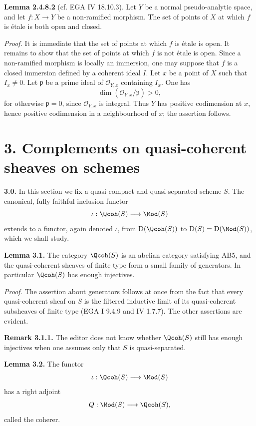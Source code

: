 \documentclass[11pt]{article}
\begin{document}
\textbf{Lemma 2.4.8.2} (cf. EGA IV 18.10.3). Let $Y$ be a normal pseudo-analytic space, and let $f:X\to Y$ be a non-ramified morphism. The set of points of $X$ at which $f$ is étale is both open and closed.

\emph{Proof.} It is immediate that the set of points at which $f$ is étale is open. It remains to show that the set of points at which $f$ is not étale is open. Since a non-ramified morphism is locally an immersion, one may suppose that $f$ is a closed immersion defined by a coherent ideal $I$. Let $x$ be a point of $X$ such that $I_x\ne0$. Let $\mathfrak p$ be a prime ideal of $\mathcal O_{Y,x}$ containing $I_x$. One has
\[
 \dim(\mathcal O_{Y,x}/\mathfrak p)>0,
\]
for otherwise $\mathfrak p=0$, since $\mathcal O_{Y,x}$ is integral. Thus $Y$ has positive codimension at $x$, hence positive codimension in a neighbourhood of $x$; the assertion follows.

\section*{3. Complements on quasi-coherent sheaves on schemes}

\textbf{3.0.} In this section we fix a quasi-compact and quasi-separated scheme $S$. The canonical, fully faithful inclusion functor
\[
 \iota:\Qcoh(S)\longrightarrow\Mod(S)
\]
extends to a functor, again denoted $\iota$, from $\mathrm D(\Qcoh(S))$ to $\mathrm D(S)=\mathrm D(\Mod(S))$, which we shall study.

\textbf{Lemma 3.1.} The category $\Qcoh(S)$ is an abelian category satisfying AB5, and the quasi-coherent sheaves of finite type form a small family of generators. In particular $\Qcoh(S)$ has enough injectives.

\emph{Proof.} The assertion about generators follows at once from the fact that every quasi-coherent sheaf on $S$ is the filtered inductive limit of its quasi-coherent subsheaves of finite type (EGA I 9.4.9 and IV 1.7.7). The other assertions are evident.

\textbf{Remark 3.1.1.} The editor does not know whether $\Qcoh(S)$ still has enough injectives when one assumes only that $S$ is quasi-separated.

\textbf{Lemma 3.2.} The functor
\[
 \iota:\Qcoh(S)\longrightarrow\Mod(S)
\]
has a right adjoint
\[
 Q:\Mod(S)\longrightarrow\Qcoh(S),
\]
called the coherer.
\end{document}

